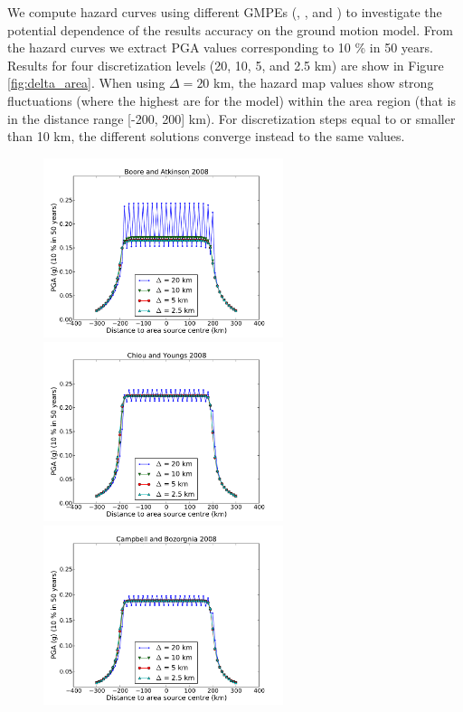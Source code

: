 We compute hazard curves using different GMPEs (\cite{boore2008},
\cite{chiou2008}, \cite{campbell2008} and \cite{abrahamson2008}) to investigate
the potential dependence of the results accuracy on the ground motion model.
From the hazard curves we extract PGA values corresponding to 10 \% in 50 years.
Results for four discretization levels (20, 10, 5, and 2.5 km) are show in
Figure \ref{fig:delta_area}. When using $\Delta=20$ km, the hazard map values
show strong fluctuations (where the highest are for the \cite{boore2008} model)
within the area region (that is in the distance range [-200, 200] km). For
discretization steps equal to or smaller than 10 km, the different solutions
converge instead to the same values.
\begin{figure}
\centering
\includegraphics[width=7cm]{./Pictures/PGA_0pt1_source_model_a5_BA2008.pdf}
\includegraphics[width=7cm]{./Pictures/PGA_0pt1_source_model_a5_CY2008.pdf}
\includegraphics[width=7cm]{./Pictures/PGA_0pt1_source_model_a5_CB2008.pdf}

\end{figure}
